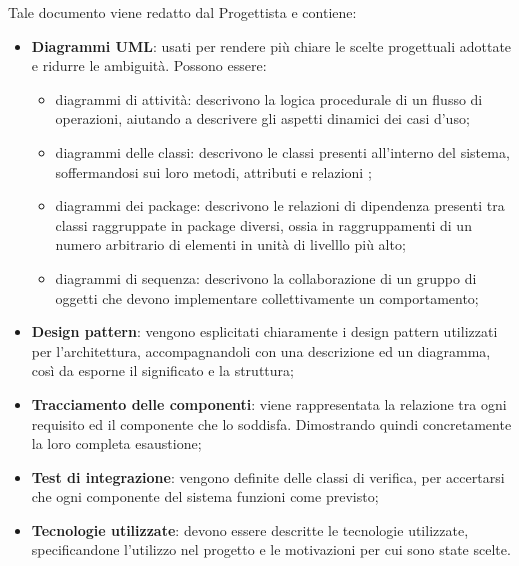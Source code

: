   Tale documento viene redatto dal Progettista e contiene:
  \begin{itemize}
   	 	\item{\textbf{Diagrammi UML}}: usati per rendere più chiare le scelte progettuali adottate e ridurre le ambiguità. Possono essere:
       		\begin{itemize}
               	\item{diagrammi di attività}: descrivono la logica procedurale di un flusso di operazioni, aiutando a descrivere gli aspetti dinamici dei casi d'uso; 
    			\item{diagrammi delle classi:} descrivono le classi presenti all'interno del sistema, soffermandosi sui loro metodi, attributi e relazioni ; 
    			\item{diagrammi dei package}: descrivono le relazioni di dipendenza presenti tra classi raggruppate in package diversi, ossia in raggruppamenti di un numero arbitrario di elementi in unità di livelllo più alto;  			
				\item{diagrammi di sequenza}: descrivono la collaborazione di un gruppo di oggetti che devono implementare collettivamente un comportamento;                  
			\end{itemize}
			
		\item \textbf{Design pattern}: vengono esplicitati chiaramente i design pattern utilizzati per l'architettura, accompagnandoli con una descrizione ed un diagramma, così da esporne il significato e la struttura; 
		\item \textbf{Tracciamento delle componenti}: viene rappresentata la relazione tra ogni requisito ed il componente che lo soddisfa. Dimostrando quindi concretamente la loro completa esaustione;
		\item \textbf{Test di integrazione}: vengono definite delle classi di verifica, per accertarsi che ogni componente del sistema funzioni come previsto; 
		\item \textbf{Tecnologie utilizzate}: devono essere descritte le tecnologie utilizzate, specificandone l'utilizzo nel progetto e le motivazioni per cui sono state scelte. 
  \end{itemize}
  
